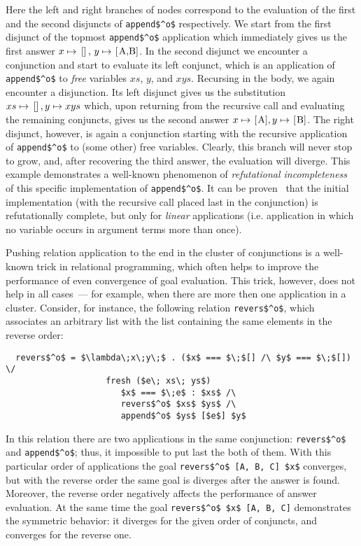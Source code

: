 Here the left and right branches of nodes correspond to the evaluation of the first and the second disjuncts of \lstinline|append$^o$| respectively. We start from
the first disjunct of the topmost \lstinline|append$^o$| application which immediately gives us the first answer $x\mapsto\mbox{\lstinline|[]|},\,y\mapsto\mbox{\lstinline|[A,B]|}$.
In the second disjunct we encounter a conjunction and start to evaluate its left conjunct, which is an application of \lstinline|append$^o$| to \emph{free} variables
$xs$, $y$, and $xys$. Recursing in the body, we again encounter a disjunction. Its left disjunct gives us the substitution $xs\mapsto\mbox{\lstinline|[]|},y\mapsto xys$ which, upon 
returning from the recursive call and evaluating the remaining conjuncts, gives us the second answer $x\mapsto\mbox{\lstinline|[A]|},y\mapsto\mbox{\lstinline|[B]|}$. The right
disjunct, however, is again a conjunction starting with the recursive application of \lstinline|append$^o$| to (some other) free variables. Clearly, this branch will never stop to
grow, and, after recovering the third answer, the evaluation will diverge. This example demonstrates a well-known phenomenon of \emph{refutational incompleteness}~\cite{fair:WillThesis}
of this specific implementation of \lstinline|append$^o$|. It can be proven~\cite{fair:semantics} that the initial implementation (with the recursive call placed last in the conjunction)
is refutationally complete, but only for \emph{linear} applications (i.e. application in which no variable occurs in argument terms more than once).

Pushing relation application to the end in the cluster of conjunctions is a well-known trick in relational programming, which often helps to improve the performance of even
convergence of goal evaluation. This trick, however, does not help in all cases~--- for example, when there are more then one application in a cluster. Consider, for instance, the
following relation \lstinline{revers$^o$}, which associates an arbitrary list with the list containing the same elements in the reverse order:

\begin{lstlisting}
  revers$^o$ = $\lambda\;x\;y\;$ . ($x$ === $\;$[] /\ $y$ === $\;$[]) \/
                    fresh ($e\; xs\; ys$) 
                       $x$ === $\;e$ : $xs$ /\ 
                       revers$^o$ $xs$ $ys$ /\
                       append$^o$ $ys$ [$e$] $y$
\end{lstlisting}

In this relation there are two applications in the same conjunction: \lstinline{revers$^o$} and \lstinline{append$^o$}; thus, it impossible to put last the both of them. With this particular
order of applications the goal \lstinline|revers$^o$ [A, B, C] $x$| converges, but with the reverse order the same goal is diverges after the answer is found. Moreover, the reverse order negatively
affects the performance of answer evaluation. At the same time the goal \lstinline|revers$^o$ $x$ [A, B, C]| demonstrates the symmetric behavior: it diverges for the given order of conjuncts,
and converges for the reverse one.

